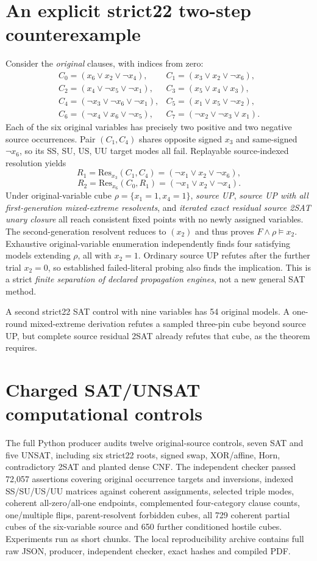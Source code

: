 \documentclass[10pt]{article}
\begin{document}
\section{An explicit strict22 two-step counterexample}
Consider the \emph{original} clauses, with indices from zero:
\[
\begin{array}{ll}
C_0=(x_6\vee x_2\vee\neg x_4),&C_1=(x_3\vee x_2\vee\neg x_6),\\
C_2=(x_4\vee\neg x_5\vee\neg x_1),&C_3=(x_5\vee x_4\vee x_3),\\
C_4=(\neg x_3\vee\neg x_6\vee\neg x_1),&C_5=(x_1\vee x_5\vee\neg x_2),\\
C_6=(\neg x_4\vee x_6\vee\neg x_5),&C_7=(\neg x_2\vee\neg x_3\vee x_1).
\end{array}
\]
Each of the six original variables has precisely two positive and two negative source occurrences. Pair $(C_1,C_4)$ shares opposite signed $x_3$ and same-signed $\neg x_6$, so its SS, SU, US, UU target modes all fail. Replayable source-indexed resolution yields
\[
R_1=\mathrm{Res}_{x_3}(C_1,C_4)=(\neg x_1\vee x_2\vee\neg x_6),
\]
\[
R_2=\mathrm{Res}_{x_6}(C_0,R_1)=(\neg x_1\vee x_2\vee\neg x_4).
\]
Under original-variable cube $\rho=\{x_1=1,x_4=1\}$, \emph{source UP}, \emph{source UP with all first-generation mixed-extreme resolvents}, and \emph{iterated exact residual source 2SAT unary closure} all reach consistent fixed points with no newly assigned variables. The second-generation resolvent reduces to $(x_2)$ and thus proves $F\wedge\rho\models x_2$. Exhaustive original-variable enumeration independently finds four satisfying models extending $\rho$, all with $x_2=1$. Ordinary source UP refutes after the further trial $x_2=0$, so established failed-literal probing also finds the implication. This is a strict \emph{finite separation of declared propagation engines}, not a new general SAT method.

A second strict22 SAT control with nine variables has 54 original models. A one-round mixed-extreme derivation refutes a sampled three-pin cube beyond source UP, but complete source residual 2SAT already refutes that cube, as the theorem requires.

\section{Charged SAT/UNSAT computational controls}
The full Python producer audits twelve original-source controls, seven SAT and five UNSAT, including six strict22 roots, signed swap, XOR/affine, Horn, contradictory 2SAT and planted dense CNF. The independent checker passed 72,057 assertions covering original occurrence targets and inversions, indexed SS/SU/US/UU matrices against coherent assignments, selected triple modes, coherent all-zero/all-one endpoints, complemented four-category clause counts, one/multiple flips, parent-resolvent forbidden cubes, all 729 coherent partial cubes of the six-variable source and 650 further conditioned hostile cubes. Experiments run as short chunks. The local reproducibility archive contains full raw JSON, producer, independent checker, exact hashes and compiled PDF.
\end{document}
